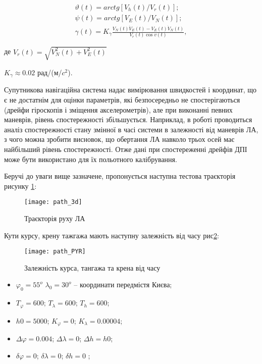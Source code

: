 \begin{equation}\label{emu_path_pyr} 
\begin{array}{l} 
{\vartheta(t)=arctg[V_{h} (t)/V_{r} (t)];} \\ 
{\psi (t)=arctg[V_{E}(t)/V_{N} (t)];} \\ 
{\gamma (t)=K_{\gamma }\frac{V_{N}(t)\dot{V}_{E}(t)-V_{E}(t)\dot{V}_{N}(t)}{V_{r}(t)\cos v(t)},}
 \end{array}\end{equation} 
\begin{ESKDexplanation}
\item де $V_{r}(t)=\sqrt{V_{N}^{2} (t)+V_{E}^{2} (t)}$
\item $K_{\gamma}\approx 0.02$  рад/(м/$c^2$).
\end{ESKDexplanation}

Супутникова навігаційна система надає вимірювання швидкостей і координат, що є не достатнім для оцінки параметрів, які безпосередньо не спостерігаються (дрейфи гіроскопів і зміщення акселерометрів), але при виконанні певних маневрів, рівень спостережності збільшується. Наприклад, в роботі \cite{bib:observ} проводиться аналіз спостережності стану змінної в часі системи в залежності від маневрів ЛА, з чого можна зробити висновок, що обертання ЛА навколо трьох осей має найбільший рівень спостережності. Отже дані при спостереженні дрейфів ДПІ може бути використано для їх польотного калібрування. 

Беручі до уваги вище зазначене, пропонується наступна тестова траєкторія рисунку \ref{fig:path_3d}:

\begin{figure}[H]
\centering
\texttt{[image: path\_3d]}
\caption{Траєкторія руху ЛА}
\label{fig:path_3d}
\end{figure}
Кути курсу, крену тажгажа мають наступну залежність від часу рис\ref{fig:path_PYR}:
\begin{figure}[H]
\centering
\texttt{[image: path\_PYR]}
\caption{Залежність курса, тангажа та крена від часу}
\label{fig:path_PYR}
\end{figure}

\begin{itemize}
\item $\varphi_{0}=55^{o}$ $\lambda_{0}=30^{o}$ -- координати передмістя Києва;
\item $T_{\varphi } = 600$; $T_{\lambda } =  600$; $T_{h} =  600$;
\item $h0 = 5000$; $K_{\varphi } = 0$; $K_{\lambda } = 0.00004$;
\item $\Delta \varphi =0.004$; $\Delta \lambda = 0$; $\Delta h = h0$;
\item $\delta \varphi = 0$; $\delta \lambda =0$; $\delta h =0$ ;
\end{itemize}

